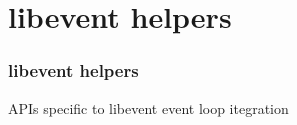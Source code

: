 \hypertarget{group__event}{}\section{libevent helpers}
\label{group__event}
\subsubsection*{libevent helpers}

A\+P\+Is specific to libevent event loop itegration 